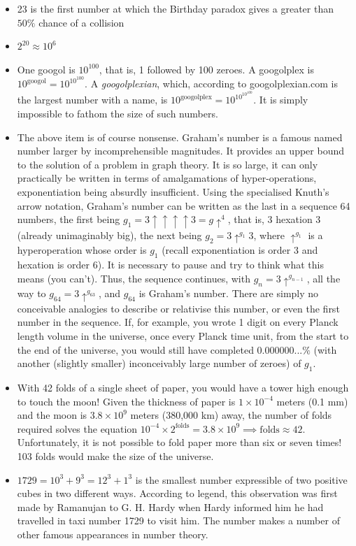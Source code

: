 \documentclass[11pt]{amsart}
\begin{document}
\begin{itemize}
\item 23 is the first number at which the Birthday paradox gives a greater than $50\%$ chance of a collision
\item $2^{20} \approx 10^6$
\item One googol is $10^{100}$, that is, 1 followed by 100 zeroes. A googolplex is $10^{\text{googol}} = 10^{10^{100}}$. A \emph{googolplexian}, which, according to googolplexian.com is the largest number with a name, is $10^{\text{googolplex}} = 10^{10^{10^{100}}}$. It is simply impossible to fathom the size of such numbers.
\item The above item is of course nonsense. Graham's number is a famous named number larger by incomprehensible magnitudes. It provides an upper bound to the solution of a problem in graph theory. It is so large, it can only practically be written in terms of amalgamations of hyper-operations, exponentiation being absurdly insufficient. Using the specialised Knuth's arrow notation, Graham's number can be written as the last in a sequence 64 numbers, the first being $g_1 = 3\uparrow\uparrow\uparrow\uparrow3 = g\uparrow^4$, that is, 3 hexation 3 (already unimaginably big), the next being $g_2 = 3\uparrow^{g_1}3$, where $\uparrow^{g_1}$ is a hyperoperation whose order is $g_1$ (recall exponentiation is order 3 and hexation is order 6). It is necessary to pause and try to think what this means (you can't). Thus, the sequence continues, with $g_n = 3\uparrow^{g_{n-1}}$, all the way to $g_{64} = 3\uparrow^{g_{63}}$, and $g_{64}$ is Graham's number.
There are simply no conceivable analogies to describe or relativise this number, or even the first number in the sequence. If, for example, you wrote 1 digit on every Planck length volume in the universe, once every Planck time unit, from the start to the end of the universe, you would still have completed $0.000000...\%$ (with another (slightly smaller) inconceivably large number of zeroes) of $g_1$.
\item With 42 folds of a single sheet of paper, you would have a tower high enough to touch the moon! Given the thickness of paper is $1 \times 10^{-4}$ meters (0.1 mm) and the moon is $3.8 \times 10^{9}$ meters (380,000 km) away, the number of folds required solves the equation $10^{-4}\times 2^{\text{folds}} = 3.8\times10^9 \implies \text{folds} \approx 42$. Unfortunately, it is not possible to fold paper more than six or seven times! 103 folds would make the size of the universe.
\item $1729 = 10^3 + 9^3 = 12^3 + 1^3$ is the smallest number expressible of two positive cubes in two different ways. According to legend, this observation was first made by Ramanujan to G. H. Hardy when Hardy informed him he had travelled in taxi number 1729 to visit him. The number makes a number of other famous appearances in number theory.

\end{itemize}
\end{document}
